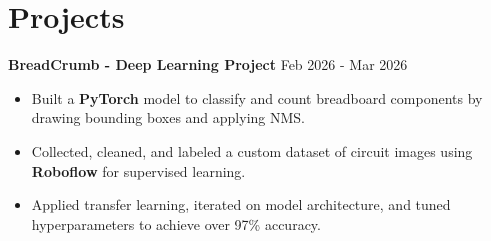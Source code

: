 \documentclass[10pt,letterpaper]{article}
\begin{document}

\section{Projects}


\textbf{BreadCrumb - Deep Learning Project} \hfill Feb 2026 - Mar 2026 \\
\begin{itemize}
    \item Built a \textbf{PyTorch} model to classify and count breadboard components by drawing bounding boxes and applying NMS.
    \item Collected, cleaned, and labeled a custom dataset of circuit images using \textbf{Roboflow} for supervised learning.
    \item Applied transfer learning, iterated on model architecture, and tuned hyperparameters to achieve over 97\% accuracy.
\end{itemize}
\end{document}
